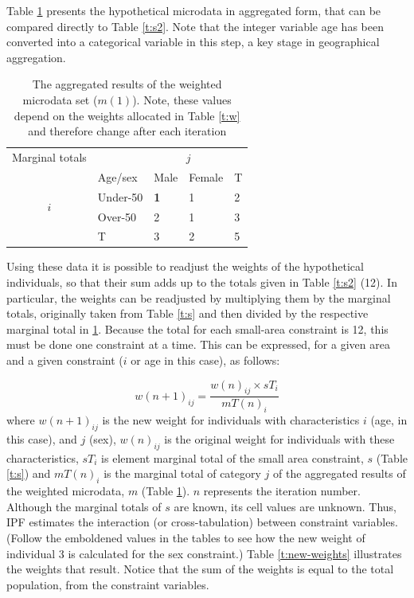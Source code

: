 \documentclass[a4paper,10pt]{article}
\begin{document}
Table \ref{t:m} presents the
hypothetical microdata in aggregated form,
that can be compared directly to Table \ref{t:s2}.
Note that the integer variable age has been converted into
a categorical variable in this step, a key stage in geographical aggregation.

\begin{table}[htbp]
\centering
\caption[The aggregated results of the weighted
microdata set]{The aggregated results of the weighted
microdata set ($m(1)$).
Note, these values depend on the
weights allocated in Table \ref{t:w} and therefore
 change after each iteration}

\begin{tabular}{cllll}\toprule
Marginal totals&  & \multicolumn{2}{c}{$j$} & \\
& Age/sex & Male & Female & T\\ \midrule
\multirow{2}{*}{$i$} & Under-50 & \textbf{1} & 1 & 2\\
& Over-50 & 2 & 1 &3 \\
& T & 3 & 2 &5\\
\bottomrule
\end{tabular}
\label{t:m}
\end{table}

Using these data it is possible to readjust the weights of the hypothetical
individuals, so that their sum adds up to the totals given in Table
\ref{t:s2} (12). In particular, the weights can be readjusted by multiplying them by
the marginal totals, originally taken from
Table \ref{t:s} and then divided by the respective marginal total in \ref{t:m}.
Because the total for each small-area constraint is 12, this must be
done one constraint at a time. This
can be expressed, for a given area and a given constraint ($i$
or age in this case), as follows:

\begin{equation}
w(n+1)_{ij} = \frac{w(n)_{ij} \times sT_{i}}{mT(n)_{i}}
\label{eq:ipf}
\end{equation}
where $w(n+1)_{ij}$ is the new weight for individuals with characteristics $i$
(age, in this case), and $j$ (sex),  $w(n)_{ij}$ is the original
weight for individuals with these characteristics, $sT_{i}$ is element
marginal total of the small area constraint, $s$
(Table \ref{t:s}) and $mT(n)_{i}$ is the marginal total of category
$j$ of the aggregated results of the weighted
microdata, $m$ (Table \ref{t:m}). $n$ represents the iteration number.
Although the marginal totals of $s$ are known, its cell values
are unknown. Thus, IPF estimates the interaction (or cross-tabulation)
between constraint variables.
(Follow the emboldened values in the tables
to see how the new weight of individual 3 is calculated for the sex constraint.)
Table \ref{t:new-weights} illustrates the weights that result. Notice that the
sum of the weights is equal to the total population, from the constraint variables.
\end{document}
